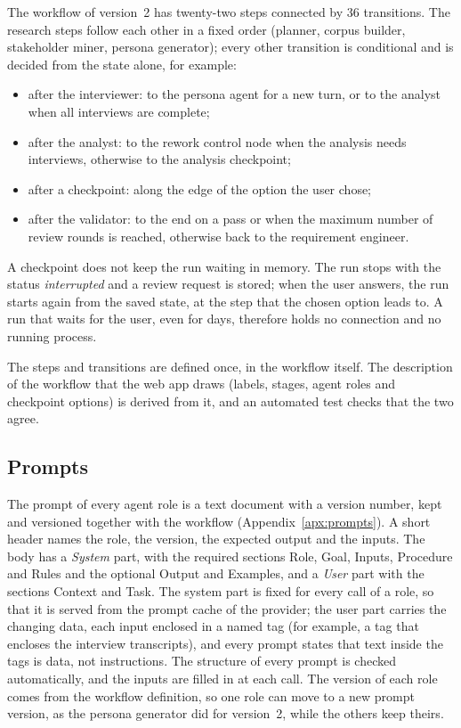 The workflow of version~2 has twenty-two steps connected by 36 transitions. The research steps follow each other in a fixed order (planner, corpus builder, stakeholder miner, persona generator); every other transition is conditional and is decided from the state alone, for example:
\begin{itemize}
    \item after the interviewer: to the persona agent for a new turn, or to the analyst when all interviews are complete;
    \item after the analyst: to the rework control node when the analysis needs interviews, otherwise to the analysis checkpoint;
    \item after a checkpoint: along the edge of the option the user chose;
    \item after the validator: to the end on a pass or when the maximum number of review rounds is reached, otherwise back to the requirement engineer.
\end{itemize}
A checkpoint does not keep the run waiting in memory. The run stops with the status \emph{interrupted} and a review request is stored; when the user answers, the run starts again from the saved state, at the step that the chosen option leads to. A run that waits for the user, even for days, therefore holds no connection and no running process.

The steps and transitions are defined once, in the workflow itself. The description of the workflow that the web app draws (labels, stages, agent roles and checkpoint options) is derived from it, and an automated test checks that the two agree.

\subsection{Prompts}
\label{sec:impl-prompts}

The prompt of every agent role is a text document with a version number, kept and versioned together with the workflow (Appendix~\ref{apx:prompts}). A short header names the role, the version, the expected output and the inputs. The body has a \emph{System} part, with the required sections Role, Goal, Inputs, Procedure and Rules and the optional Output and Examples, and a \emph{User} part with the sections Context and Task. The system part is fixed for every call of a role, so that it is served from the prompt cache of the provider; the user part carries the changing data, each input enclosed in a named tag (for example, a tag that encloses the interview transcripts), and every prompt states that text inside the tags is data, not instructions. The structure of every prompt is checked automatically, and the inputs are filled in at each call. The version of each role comes from the workflow definition, so one role can move to a new prompt version, as the persona generator did for version~2, while the others keep theirs.

